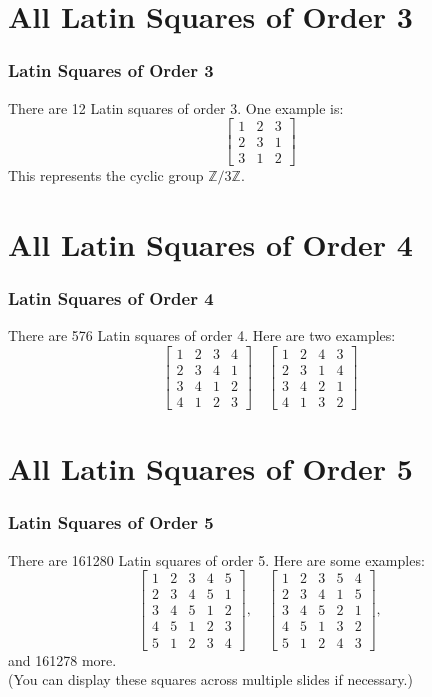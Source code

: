 \documentclass{beamer}
\begin{document}
\section{All Latin Squares of Order 3}
\begin{frame}
\frametitle{Latin Squares of Order 3}
There are 12 Latin squares of order 3. One example is:
\[ 
\begin{bmatrix} 
1 & 2 & 3 \\ 
2 & 3 & 1 \\ 
3 & 1 & 2 
\end{bmatrix}
\]
This represents the cyclic group \( \mathbb{Z}/3\mathbb{Z} \).
\end{frame}

\section{All Latin Squares of Order 4}
\begin{frame}
\frametitle{Latin Squares of Order 4}
There are 576 Latin squares of order 4. Here are two examples:
\[
\begin{bmatrix}
1 & 2 & 3 & 4 \\
2 & 3 & 4 & 1 \\
3 & 4 & 1 & 2 \\
4 & 1 & 2 & 3
\end{bmatrix}
\quad
\begin{bmatrix}
1 & 2 & 4 & 3 \\
2 & 3 & 1 & 4 \\
3 & 4 & 2 & 1 \\
4 & 1 & 3 & 2
\end{bmatrix}
\]
\end{frame}

\section{All Latin Squares of Order 5}
\begin{frame}
\frametitle{Latin Squares of Order 5}
There are 161280 Latin squares of order 5. Here are some examples:
\[
\begin{bmatrix}
1 & 2 & 3 & 4 & 5 \\
2 & 3 & 4 & 5 & 1 \\
3 & 4 & 5 & 1 & 2 \\
4 & 5 & 1 & 2 & 3 \\
5 & 1 & 2 & 3 & 4
\end{bmatrix},
\quad
\begin{bmatrix}
1 & 2 & 3 & 5 & 4 \\
2 & 3 & 4 & 1 & 5 \\
3 & 4 & 5 & 2 & 1 \\
4 & 5 & 1 & 3 & 2 \\
5 & 1 & 2 & 4 & 3
\end{bmatrix},
\]
and 161278 more.\\
(You can display these squares across multiple slides if necessary.)
\end{frame}
\end{document}
